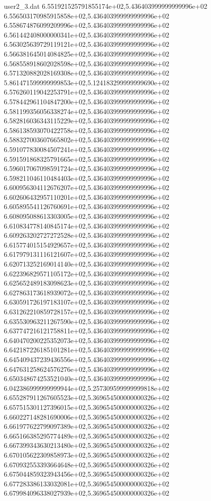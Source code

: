 \begin{filecontents}{user2_3.dat}
6.551921525791855174e+02,5.436403999999999996e+02
6.556503170985915858e+02,5.436403999999999996e+02
6.558674876099209996e+02,5.436403999999999996e+02
6.561442408000000341e+02,5.436403999999999996e+02
6.563025639729119121e+02,5.436403999999999996e+02
6.566381645014084825e+02,5.436403999999999996e+02
6.568558918602028598e+02,5.436403999999999996e+02
6.571320882028169308e+02,5.436403999999999996e+02
5.861471599999999853e+02,5.124183299999999690e+02
6.576260119042253791e+02,5.436403999999999996e+02
6.578442961104847200e+02,5.436403999999999996e+02
6.581199356056338274e+02,5.436403999999999996e+02
6.582816036343115229e+02,5.436403999999999996e+02
6.586138593070422758e+02,5.436403999999999996e+02
6.588327003607665802e+02,5.436403999999999996e+02
6.591077830084507241e+02,5.436403999999999996e+02
6.591591868325791665e+02,5.436403999999999996e+02
6.596017067098591724e+02,5.436403999999999996e+02
6.598211046110484403e+02,5.436403999999999996e+02
6.600956304112676207e+02,5.436403999999999996e+02
6.602606432957110201e+02,5.436403999999999996e+02
6.605895541126760691e+02,5.436403999999999996e+02
6.608095088613303005e+02,5.436403999999999996e+02
6.610834778140845174e+02,5.436403999999999996e+02
6.609263202727272528e+02,5.436403999999999996e+02
6.615774015154929657e+02,5.436403999999999996e+02
6.617979131116121607e+02,5.436403999999999996e+02
6.620713252169014140e+02,5.436403999999999996e+02
6.622396829571105172e+02,5.436403999999999996e+02
6.625652489183098623e+02,5.436403999999999996e+02
6.627863173618939072e+02,5.436403999999999996e+02
6.630591726197183107e+02,5.436403999999999996e+02
6.631262210859728157e+02,5.436403999999999996e+02
6.635530963211267590e+02,5.436403999999999996e+02
6.637747216121758811e+02,5.436403999999999996e+02
6.640470200225352073e+02,5.436403999999999996e+02
6.642187226185101281e+02,5.436403999999999996e+02
6.645409437239436556e+02,5.436403999999999996e+02
6.647631258624576276e+02,5.436403999999999996e+02
6.650348674253521040e+02,5.436403999999999996e+02
6.042386999999999944e+02,5.257309599999999818e+02
6.655287911267605523e+02,5.369654500000000326e+02
6.657515301127396015e+02,5.369654500000000326e+02
6.660227148281690006e+02,5.369654500000000326e+02
6.661977622799097389e+02,5.369654500000000326e+02
6.665166385295774489e+02,5.369654500000000326e+02
6.667399343630213480e+02,5.369654500000000326e+02
6.670105622309858973e+02,5.369654500000000326e+02
6.670932553393664648e+02,5.369654500000000326e+02
6.675044859323943456e+02,5.369654500000000326e+02
6.677283386133032081e+02,5.369654500000000326e+02
6.679984096338027939e+02,5.369654500000000326e+02

\end{filecontents}
